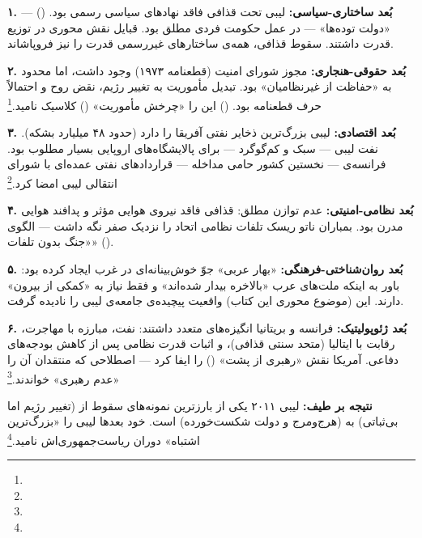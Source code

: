 \begin{tcolorbox}[casebox, title={مطالعه‌ی موردی: لیبی ۲۰۱۱ — تحلیل شش‌وجهی}]

\textbf{۱. بُعد ساختاری-سیاسی:}
لیبی تحت قذافی فاقد نهادهای سیاسی رسمی بود.  () — «دولت توده‌ها» — در عمل حکومت فردی مطلق بود. قبایل نقش محوری در توزیع قدرت داشتند. سقوط قذافی، همه‌ی ساختارهای غیررسمی قدرت را نیز فروپاشاند.

\textbf{۲. بُعد حقوقی-هنجاری:}
مجوز شورای امنیت (قطعنامه ۱۹۷۳) وجود داشت، اما محدود به «حفاظت از غیرنظامیان» بود. تبدیل مأموریت به تغییر رژیم، نقض روح و احتمالاً حرف قطعنامه بود.  () این را «چرخش مأموریت» () کلاسیک نامید.\footnote{}

\textbf{۳. بُعد اقتصادی:}
لیبی بزرگ‌ترین ذخایر نفتی آفریقا را دارد (حدود ۴۸ میلیارد بشکه). نفت لیبی — سبک و کم‌گوگرد — برای پالایشگاه‌های اروپایی بسیار مطلوب بود. فرانسه‌ی  — نخستین کشور حامی مداخله — قراردادهای نفتی عمده‌ای با شورای انتقالی لیبی امضا کرد.\footnote{}

\textbf{۴. بُعد نظامی-امنیتی:}
عدم توازن مطلق: قذافی فاقد نیروی هوایی مؤثر و پدافند هوایی مدرن بود. بمباران ناتو ریسک تلفات نظامی اتحاد را نزدیک صفر نگه داشت — الگوی «جنگ بدون تلفات» ().

\textbf{۵. بُعد روان‌شناختی-فرهنگی:}
«بهار عربی» جوّ خوش‌بینانه‌ای در غرب ایجاد کرده بود: باور به اینکه ملت‌های عرب «بالاخره بیدار شده‌اند» و فقط نیاز به «کمکی از بیرون» دارند. این  (موضوع محوری این کتاب) واقعیت پیچیده‌ی جامعه‌ی لیبی را نادیده گرفت.

\textbf{۶. بُعد ژئوپولیتیک:}
فرانسه و بریتانیا انگیزه‌های متعدد داشتند: نفت، مبارزه با مهاجرت، رقابت با ایتالیا (متحد سنتی قذافی)، و اثبات قدرت نظامی پس از کاهش بودجه‌های دفاعی. آمریکا نقش «رهبری از پشت» () را ایفا کرد — اصطلاحی که منتقدان آن را «عدم رهبری» خواندند.\footnote{}
\end{tcolorbox}

\textbf{نتیجه بر طیف:} لیبی ۲۰۱۱ یکی از بارزترین نمونه‌های سقوط از  (تغییر رژیم اما بی‌ثباتی) به  (هرج‌ومرج و دولت شکست‌خورده) است.  خود بعدها لیبی را «بزرگ‌ترین اشتباه» دوران ریاست‌جمهوری‌اش نامید.\footnote{}


